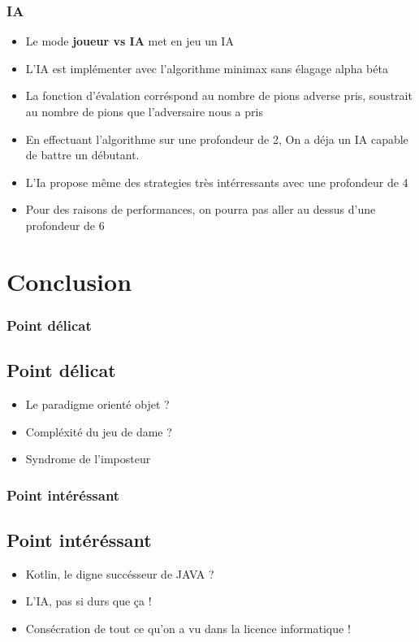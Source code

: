 \documentclass{beamer}
\begin{document}
\begin{frame}
  \frametitle{IA}

  \begin{itemize}
    \item Le mode \textbf{joueur vs IA} met en jeu un IA 
    \item L'IA est implémenter avec l'algorithme minimax sans élagage alpha béta
    \item La fonction d'évalation corréspond au nombre de pions adverse pris, 
    soustrait au nombre de pions que l'adversaire nous a pris
    \item En effectuant l'algorithme sur une profondeur de 2,
    On a déja un IA capable de battre un débutant.
    \item L'Ia propose même des strategies très intérressants avec une profondeur de 4
    \item Pour des raisons de performances, 
    on pourra pas aller au dessus d'une profondeur de 6
  \end{itemize}

\end{frame}
%
%
\section{Conclusion}

\begin{frame}
  \frametitle{Point délicat}
  \subsection{Point délicat}
  \begin{itemize}
    \item Le paradigme orienté objet ?
    \item Compléxité du jeu de dame ?
    \item Syndrome de l'imposteur
  \end{itemize}

\end{frame}

\begin{frame}
  \frametitle{Point intéréssant}
  \subsection{Point intéréssant}
  \begin{itemize}
    \item Kotlin, le digne succésseur de JAVA ?
    \item L'IA, pas si durs que ça !
    \item Consécration de tout ce qu'on a vu dans la licence informatique !
  \end{itemize}

\end{frame}
\end{document}
